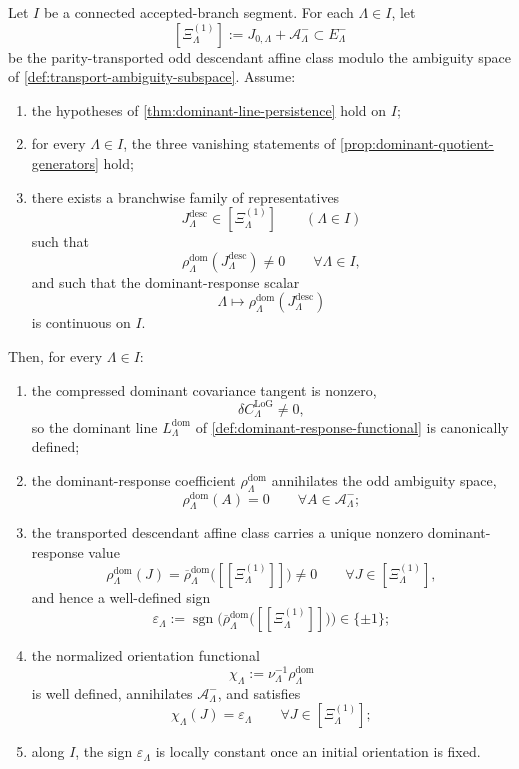\documentclass[11pt]{article}
\begin{document}
\begin{theorem}
\label{thm:active-response-transport-minimal}
Let \(I\) be a connected accepted-branch segment.
For each \(\Lambda\in I\), let
\[
[\Xi^{(1)}_{\Lambda}]
:=
J_{0,\Lambda}+\mathcal A^-_{\Lambda}
\subset E^-_{\Lambda}
\]
be the parity-transported odd descendant affine class modulo the ambiguity space of
\cref{def:transport-ambiguity-subspace}.
Assume:
\begin{enumerate}[leftmargin=2em]
\item the hypotheses of \cref{thm:dominant-line-persistence} hold on \(I\);
\item for every \(\Lambda\in I\), the three vanishing statements of
  \cref{prop:dominant-quotient-generators} hold;
\item there exists a branchwise family of representatives
  \[
  J^{\mathrm{desc}}_{\Lambda}\in[\Xi^{(1)}_{\Lambda}]
  \qquad
  (\Lambda\in I)
  \]
  such that
  \[
  \rho^{\mathrm{dom}}_{\Lambda}(J^{\mathrm{desc}}_{\Lambda})
  \neq 0
  \qquad
  \forall \Lambda\in I,
  \]
  and such that the dominant-response scalar
  \[
  \Lambda\longmapsto
  \rho^{\mathrm{dom}}_{\Lambda}(J^{\mathrm{desc}}_{\Lambda})
  \]
  is continuous on \(I\).
\end{enumerate}
Then, for every \(\Lambda\in I\):
\begin{enumerate}[leftmargin=2em]
\item the compressed dominant covariance tangent is nonzero,
  \[
  \delta C^{\mathrm{LoG}}_{\Lambda}\neq 0,
  \]
  so the dominant line \(L^{\mathrm{dom}}_{\Lambda}\) of
  \cref{def:dominant-response-functional} is canonically defined;
\item the dominant-response coefficient \(\rho^{\mathrm{dom}}_{\Lambda}\) annihilates the odd
  ambiguity space,
  \[
  \rho^{\mathrm{dom}}_{\Lambda}(A)=0
  \qquad
  \forall A\in\mathcal A^-_{\Lambda};
  \]
\item the transported descendant affine class carries a unique nonzero dominant-response value
  \[
  \rho^{\mathrm{dom}}_{\Lambda}(J)
  =
  \overline{\rho}^{\mathrm{dom}}_{\Lambda}\big([\![\Xi^{(1)}_{\Lambda}]\!]\big)
  \neq 0
  \qquad
  \forall J\in[\Xi^{(1)}_{\Lambda}],
  \]
  and hence a well-defined sign
  \[
  \varepsilon_{\Lambda}
  :=
  \operatorname{sgn}\!\Big(
  \overline{\rho}^{\mathrm{dom}}_{\Lambda}\big([\![\Xi^{(1)}_{\Lambda}]\!]\big)
  \Big)
  \in\{\pm1\};
  \]
\item the normalized orientation functional
  \begin{equation}
  \chi_{\Lambda}
  :=
  \nu_{\Lambda}^{-1}\rho^{\mathrm{dom}}_{\Lambda}
  \label{eq:chi-from-rho-dom}
  \end{equation}
  is well defined, annihilates \(\mathcal A^-_{\Lambda}\), and satisfies
  \[
  \chi_{\Lambda}(J)=\varepsilon_{\Lambda}
  \qquad
  \forall J\in[\Xi^{(1)}_{\Lambda}];
  \]
\item along \(I\), the sign \(\varepsilon_{\Lambda}\) is locally constant once an initial
  orientation is fixed.
\end{enumerate}
\end{theorem}
\end{document}

